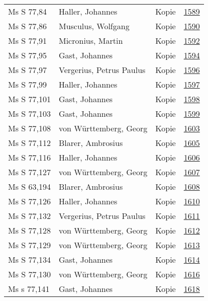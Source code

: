 \documentclass[10pt,a4paper,landscape]{report}
\begin{document}
\begin{longtable}{p{16cm}p{4cm}lr}
Ms S 77,84	&	Haller, Johannes	&	Kopie	&	\href{http://130.60.24.72/assignment/1589}{1589}\\
Ms S 77,86	&	Musculus, Wolfgang	&	Kopie	&	\href{http://130.60.24.72/assignment/1590}{1590}\\
Ms S 77,91	&	Micronius, Martin	&	Kopie	&	\href{http://130.60.24.72/assignment/1592}{1592}\\
Ms S 77,95	&	Gast, Johannes	&	Kopie	&	\href{http://130.60.24.72/assignment/1594}{1594}\\
Ms S 77,97	&	Vergerius, Petrus Paulus	&	Kopie	&	\href{http://130.60.24.72/assignment/1596}{1596}\\
Ms S 77,99	&	Haller, Johannes	&	Kopie	&	\href{http://130.60.24.72/assignment/1597}{1597}\\
Ms S 77,101	&	Gast, Johannes	&	Kopie	&	\href{http://130.60.24.72/assignment/1598}{1598}\\
Ms S 77,103	&	Gast, Johannes	&	Kopie	&	\href{http://130.60.24.72/assignment/1599}{1599}\\
Ms S 77,108	&	von Württemberg, Georg	&	Kopie	&	\href{http://130.60.24.72/assignment/1603}{1603}\\
Ms S 77,112	&	Blarer, Ambrosius	&	Kopie	&	\href{http://130.60.24.72/assignment/1605}{1605}\\
Ms S 77,116	&	Haller, Johannes	&	Kopie	&	\href{http://130.60.24.72/assignment/1606}{1606}\\
Ms S 77,127	&	von Württemberg, Georg	&	Kopie	&	\href{http://130.60.24.72/assignment/1607}{1607}\\
Ms S 63,194	&	Blarer, Ambrosius	&	Kopie	&	\href{http://130.60.24.72/assignment/1608}{1608}\\
Ms S 77,126	&	Haller, Johannes	&	Kopie	&	\href{http://130.60.24.72/assignment/1610}{1610}\\
Ms S 77,132	&	Vergerius, Petrus Paulus	&	Kopie	&	\href{http://130.60.24.72/assignment/1611}{1611}\\
Ms S 77,128	&	von Württemberg, Georg	&	Kopie	&	\href{http://130.60.24.72/assignment/1612}{1612}\\
Ms S 77,129	&	von Württemberg, Georg	&	Kopie	&	\href{http://130.60.24.72/assignment/1613}{1613}\\
Ms S 77,134	&	Gast, Johannes	&	Kopie	&	\href{http://130.60.24.72/assignment/1614}{1614}\\
Ms S 77,130	&	von Württemberg, Georg	&	Kopie	&	\href{http://130.60.24.72/assignment/1616}{1616}\\
Ms s 77,141	&	Gast, Johannes	&	Kopie	&	\href{http://130.60.24.72/assignment/1618}{1618}\\

\end{longtable}
\end{document}
